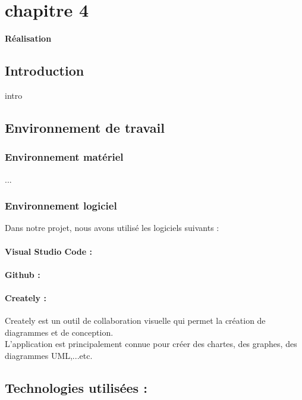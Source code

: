 
\chapter*{chapitre 4}

\textbf{\Huge Réalisation}

\setcounter{chapter}{4}
\setcounter{section}{0}

\section{Introduction}
intro

\section{Environnement de travail}

\subsection{Environnement matériel }
...


\subsection{Environnement logiciel}
Dans notre projet, nous avons utilisé les logiciels suivants :
\subsubsection{Visual Studio Code :}

\subsubsection{Github :}


\subsubsection{Creately :}

Creately est un outil de collaboration visuelle qui permet la création de diagrammes et de conception.\\
L'application est principalement connue pour créer des chartes, des graphes, des diagrammes UML,...etc.\\


\section{Technologies utilisées :}


